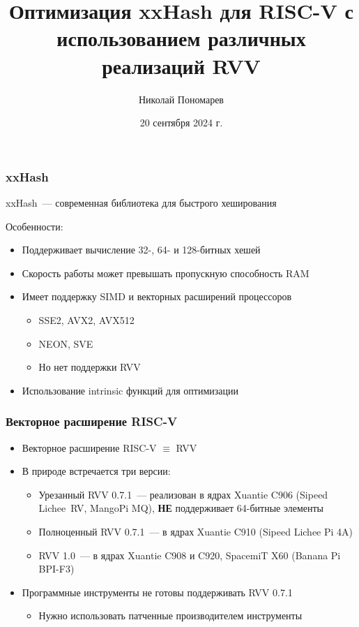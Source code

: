 \documentclass[
    aspectratio=169,
]{beamer}
\title[Оптимизация xxHash для RISC-V]{Оптимизация xxHash для RISC-V с использованием различных реализаций RVV}
\author{Николай Пономарев}
\institute[Матмех СПбГУ]{Математико-механический факультет СПбГУ}
\date{20 сентября 2024 г.}
\begin{document}
\begin{frame}
    \maketitle
\end{frame}


\begin{frame}
    \frametitle{xxHash}

    xxHash~--- современная библиотека для быстрого хеширования

    Особенности:
    \begin{itemize}
        \item Поддерживает вычисление 32-, 64- и 128-битных хешей
        \item Скорость работы может превышать пропускную способность RAM
        \item Имеет поддержку SIMD и векторных расширений процессоров
              \begin{itemize}
                  \item SSE2, AVX2, AVX512
                  \item NEON, SVE
                  \item Но нет поддержки RVV
              \end{itemize}
        \item Использование intrinsic функций для оптимизации
    \end{itemize}

\end{frame}


\begin{frame}
    \frametitle{Векторное расширение RISC-V}

    \begin{itemize}
        \item Векторное расширение RISC-V $\equiv$ RVV
        \item В природе встречается три версии:
              \begin{itemize}
                  \item Урезанный RVV 0.7.1~--- реализован в ядрах Xuantie C906 (Sipeed Lichee~RV, MangoPi MQ), \textbf{НЕ} поддерживает 64-битные элементы
                  \item Полноценный RVV 0.7.1~--- в ядрах Xuantie C910 (Sipeed Lichee Pi 4A)
                  \item RVV 1.0~--- в ядрах Xuantie C908 и C920, SpacemiT X60 (Banana Pi BPI-F3)
              \end{itemize}
        \item Программные инструменты не готовы поддерживать RVV 0.7.1
              \begin{itemize}
                  \item Нужно использовать патченные производителем инструменты
              \end{itemize}
    \end{itemize}

\end{frame}
\end{document}

